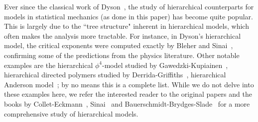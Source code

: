 \documentclass[11pt]{amsart}
\theoremstyle{definition}
\theoremstyle{remark}
\numberwithin{equation}{section}
\begin{document}
	Ever since the classical work of Dyson~\cite{Dyson}, the study of hierarchical counterparts for models in statistical mechanics (as done in this paper) has become quite popular. This is largely due to the ``tree structure" inherent in hierarchical models, which often makes the analysis more tractable. For instance, in Dyson's hierarchical model, the critical exponents were computed exactly by Bleher and Sinai~\cite{BleherSinai,BleherSinai2}, confirming some of the predictions from the physics literature. 
	Other notable examples are the hierarchical $\phi^4$-model studied by Gawedzki-Kupiainen~\cite{GawedzkiKupiainen1,GawedzkiKupiainen}, hierarchical directed polymers studied by Derrida-Griffiths~\cite{DerridaGriffiths}, hierarchical Anderson model~\cite{Bovier,Kritchevski,FyodorovOssipovRodriguez}; by no means this is a complete list.
	While we do not delve into these examples here, we refer the interested reader to the original papers and the books by Collet-Eckmann~\cite{ColletEckmann}, Sinai~\cite{Sinai} and Bauerschmidt-Brydges-Slade~\cite{BauerschmidtBrydgesSlade} for a more comprehensive study of hierarchical models.
	
\end{document}
